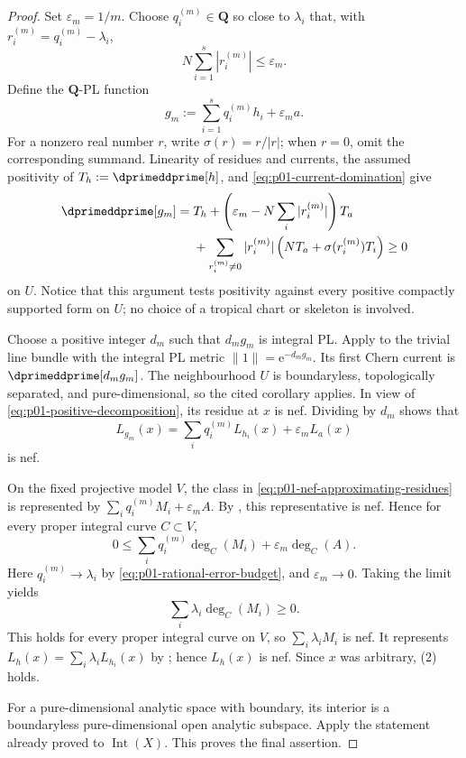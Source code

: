 \begin{proof}
Set \(\varepsilon_m=1/m\).  Choose \(q_i^{(m)}\in\mathbf Q\) so close to
\(\lambda_i\) that, with \(r_i^{(m)}=q_i^{(m)}-\lambda_i\),
\begin{equation}
\label{eq:p01-rational-error-budget}
                    N\sum_{i=1}^{s}|r_i^{(m)}|\leq\varepsilon_m.
\end{equation}
Define the \(\mathbf Q\)-PL function
\begin{equation}
\label{eq:p01-rational-positive-approximants}
                       g_m:=\sum_{i=1}^{s}q_i^{(m)}h_i
                                  +\varepsilon_m a.
\end{equation}
For a nonzero real number \(r\), write \(\sigma(r)=r/|r|\); when \(r=0\), omit
the corresponding summand.  Linearity of residues and currents, the
assumed positivity of \(T_h:=\dprimeddprime[h]\), and
\eqref{eq:p01-current-domination} give
\begin{align}
\label{eq:p01-positive-decomposition}
 \dprimeddprime[g_m]
  ={}&T_h
    +\left(\varepsilon_m-N\sum_i|r_i^{(m)}|\right)T_a \\
   &+\sum_{r_i^{(m)}\ne0}|r_i^{(m)}|
       \left(NT_a+\sigma(r_i^{(m)})T_i\right)\geq0
\end{align}
on \(U\).  Notice that this argument tests positivity against every positive
compactly supported form on \(U\); no choice of a tropical chart or skeleton
is involved.

Choose a positive integer \(d_m\) such that \(d_mg_m\) is integral PL.  Apply
\cite[Corollary~18.8.8]{CLD25} to the trivial line bundle with the integral
PL metric \(\lVert1\rVert=\mathrm e^{-d_mg_m}\).  Its first Chern current is
\(\dprimeddprime[d_mg_m]\).  The neighbourhood \(U\) is boundaryless,
topologically separated, and pure-dimensional, so the cited corollary
applies.  In view of
\eqref{eq:p01-positive-decomposition}, its residue at \(x\) is nef.  Dividing
by \(d_m\) shows that
\begin{equation}
\label{eq:p01-nef-approximating-residues}
             L_{g_m}(x)=\sum_iq_i^{(m)}L_{h_i}(x)
                              +\varepsilon_mL_a(x)
\end{equation}
is nef.

On the fixed projective model \(V\), the class in
\eqref{eq:p01-nef-approximating-residues} is represented by
\(\sum_iq_i^{(m)}M_i+\varepsilon_mA\).  By
\cite[Lemma~6.11]{GJR26}, this representative is nef.  Hence for every
proper integral curve \(C\subset V\),
\[
  0\leq
  \sum_iq_i^{(m)}\deg_C(M_i)+\varepsilon_m\deg_C(A).
\]
Here \(q_i^{(m)}\to\lambda_i\) by
\eqref{eq:p01-rational-error-budget}, and \(\varepsilon_m\to0\).  Taking the
limit yields
\[
                       \sum_i\lambda_i\deg_C(M_i)\geq0.
\]
This holds for every proper integral curve on \(V\), so
\(\sum_i\lambda_iM_i\) is nef.  It represents
\(L_h(x)=\sum_i\lambda_iL_{h_i}(x)\) by
\cite[Lemma~6.18]{GJR26}; hence \(L_h(x)\) is nef.  Since \(x\) was arbitrary,
(2) holds.

For a pure-dimensional analytic space with boundary, its interior is a
boundaryless pure-dimensional open analytic subspace.  Apply the statement
already proved to \(\operatorname{Int}(X)\).  This proves the final assertion.
\end{proof}

